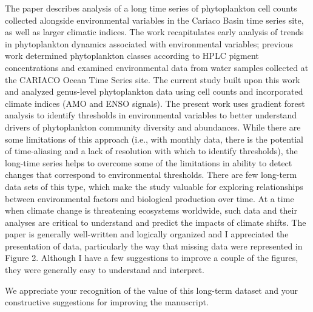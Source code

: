 \documentclass[12pt,english]{reviewresponse}
\begin{document}

\reviewer
\label{rev:2}
\begin{generalcomment}
	The paper describes analysis of a long time series of phytoplankton cell counts collected alongside environmental variables in the Cariaco Basin time series site, as well as larger climatic indices. The work recapitulates early analysis of trends in phytoplankton dynamics associated with environmental variables; previous work determined phytoplankton classes according to HPLC pigment concentrations and examined environmental data from water samples collected at the CARIACO Ocean Time Series site. The current study built upon this work and analyzed genus-level phytoplankton data using cell counts and incorporated climate indices (AMO and ENSO signals). The present work uses gradient forest analysis to identify thresholds in environmental variables to better understand drivers of phytoplankton community diversity and abundances. While there are some limitations of this approach (i.e., with monthly data, there is the potential of time-aliasing and a lack of resolution with which to identify thresholds), the long-time series helps to overcome some of the limitations in ability to detect changes that correspond to environmental thresholds. There are few long-term data sets of this type, which make the study valuable for exploring relationships between environmental factors and biological production over time. At a time when climate change is threatening ecosystems worldwide, such data and their analyses are critical to understand and predict the impacts of climate shifts. The paper is generally well-written and logically organized and I appreciated the presentation of data, particularly the way that missing data were represented in Figure 2. Although I have a few suggestions to improve a couple of the figures, they were generally easy to understand and interpret.
\end{generalcomment}
\begin{revresponse}
    We appreciate your recognition of the value of this long-term dataset and your constructive suggestions for improving the manuscript.
\end{revresponse}
\end{document}
